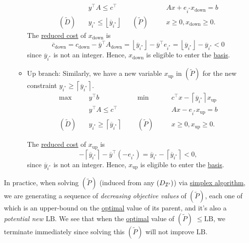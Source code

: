 \begin{remark}
\begin{itemize}
\begin{itemize}
\[\begin{alignedat}{5}
					      &y^{\top}A\leq c^{\top} 				&&		&&Ax + e_{i^{\ast}}x_{\text{down}} = b\\
					      (\widetilde{D})\quad& y_{i^{\ast}}\leq \left\lfloor \overline{y}_{i^{\ast}} \right\rfloor	&&(\widetilde{P})\quad&&x\geq 0, x_{\text{down}}\geq 0.
				      \end{alignedat}
			      \]
			      The \hyperref[def:reduced-cost]{reduced cost} of \(x_{\text{down}}\) is
			      \[
				      \overline{c}_{\text{down}}=c_{\text{down}}-\overline{y}^{\top}A_{\text{down}} = \left\lfloor \overline{y}_{i^{\ast}} \right\rfloor - \overline{y}^{\top}e_{i^{\ast}} = \left\lfloor \overline{y}_{i^{\ast}} \right\rfloor - \overline{y}_{i^{\ast}} < 0
			      \]
			      since \(\overline{y} _{i^{\ast} }\) is not an integer. Hence, \(x_{\text{down}}\) is eligible to enter the \hyperref[def:basic]{basis}.
			      \item\label{rmk:up-branch} Up branch: Similarly, we have a new variable \(x_{\text{up}}\) in \((\widetilde{P})\) for the new constraint
			      \(y_{i^{\ast}} \geq \left\lceil \overline{y} _{i^{\ast}} \right\rceil \).
			      \[
				      \begin{alignedat}{5}
					      \max ~	&y^{\top}b\qquad\qquad				&&\min~	&& c^{\top}x - \left\lceil \overline{y}_{i^{\ast}} \right\rceil x_{\text{up}}\\
					      &y^{\top}A\leq c^{\top} 				&&		&&Ax - e_{i^{\ast}} x_{\text{up}}= b                                      \\
					      (\widetilde{D})\quad& y_{i^{\ast}} \geq \left\lceil \overline{y} _{i^{\ast}} \right\rceil	&&(\widetilde{P})\quad&&x\geq 0, x_{\text{up}}\geq 0.
				      \end{alignedat}
			      \]

			      The \hyperref[def:reduced-cost]{reduced cost} of \(x_{\text{up}}\) is
			      \[
				      -\left\lceil \overline{y}_{i^{\ast}} \right\rceil - \overline{y}^{\top}(-e_{i^{\ast}}) = \overline{y}_{i^{\ast}} - \left\lceil \overline{y}_{i^{\ast}} \right\rceil < 0,
			      \]
			      since \(\overline{y} _{i^{\ast} }\) is not an integer. Hence, \(x_{\text{up}}\) is eligible to enter the \hyperref[def:basic]{basis}.
		      \end{itemize}
	\end{itemize}
\end{remark}

\begin{remark}
	In practice, when solving \((\widetilde{P})\) (induced from any \((D_{\mathcal{\MakeUppercase{i}} ^\prime})\)) via \hyperref[algo:simplex-algorithm]{simplex algorithm}, we are
	generating a sequence of \emph{decreasing objective values} of \((\widetilde{P})\), each one of which is an upper-bound on the \hyperref[def:optimal-solution]{optimal} value of its parent, and it's
	also a \emph{potential new \(\mathrm{LB}\)}. We see that when the \hyperref[def:optimal-solution]{optimal} value of \((\widetilde{P})\) \(\leq \mathrm{LB}\), we terminate immediately since solving this \((\widetilde{P})\) will not
	improve \(\mathrm{LB}\).
\end{remark}

